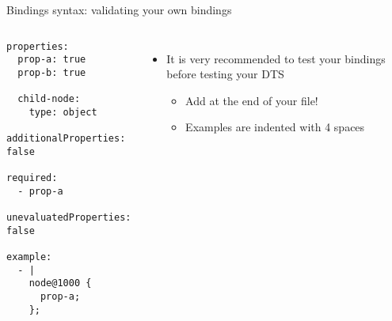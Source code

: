 \begin{frame}[fragile]{Bindings syntax: validating your own bindings}
  \begin{columns}
    \begin{block}{}
      {\fontsize{5}{6}\selectfont
\begin{verbatim}
properties:
  prop-a: true
  prop-b: true

  child-node:
    type: object
    additionalProperties: false

required:
  - prop-a

unevaluatedProperties: false

example:
  - |
    node@1000 {
      prop-a;
    };
\end{verbatim}
      }
    \end{block}
    \begin{itemize}
    \item It is very recommended to test your bindings before testing
      your DTS
      \begin{itemize}
      \item Add  at the end of your file!
      \item Examples are indented with 4 spaces
      \end{itemize}
    \end{itemize}
  \end{columns}
\end{frame}

